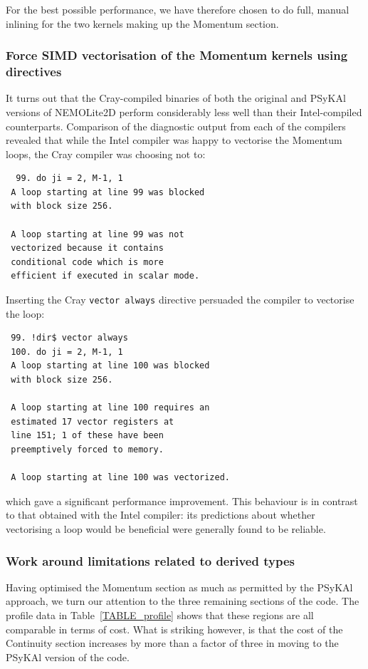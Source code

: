 \documentclass[gmd, manuscript]{copernicus}
\begin{document}
For the best possible performance, we have therefore chosen to do full, manual
inlining for the two kernels making up the Momentum section.

\subsubsection{Force SIMD vectorisation of the Momentum kernels 
 using directives}

It turns out that the Cray-compiled binaries of both the original and
{PS}y{KA}l versions of NEMOLite2D perform considerably less well than
their Intel-compiled counterparts. Comparison of the diagnostic output
from each of the compilers revealed that while the Intel compiler was
happy to vectorise the Momentum loops, the Cray compiler was choosing
not to:
\begin{verbatim}
  99. do ji = 2, M-1, 1
 A loop starting at line 99 was blocked 
 with block size 256.

 A loop starting at line 99 was not
 vectorized because it contains 
 conditional code which is more
 efficient if executed in scalar mode.
\end{verbatim}
Inserting the Cray \texttt{vector always} directive persuaded the compiler
to vectorise the loop:
\begin{verbatim}
 99. !dir$ vector always
 100. do ji = 2, M-1, 1
 A loop starting at line 100 was blocked
 with block size 256.

 A loop starting at line 100 requires an 
 estimated 17 vector registers at 
 line 151; 1 of these have been 
 preemptively forced to memory.

 A loop starting at line 100 was vectorized.
\end{verbatim}
which gave a significant performance improvement. This behaviour is in
contrast to that obtained with the Intel compiler: its predictions
about whether vectorising a loop would be beneficial were generally
found to be reliable.

\subsubsection{Work around limitations related to derived types}

Having optimised the Momentum section as much as permitted by the
{PS}y{KA}l approach, we turn our attention to the three remaining
sections of the code. The profile data in Table~\ref{TABLE_profile}
shows that these regions are all comparable in terms of cost. What is
striking however, is that the cost of the Continuity section increases
by more than a factor of three in moving to the {PS}y{KA}l version of the
code.
\end{document}
